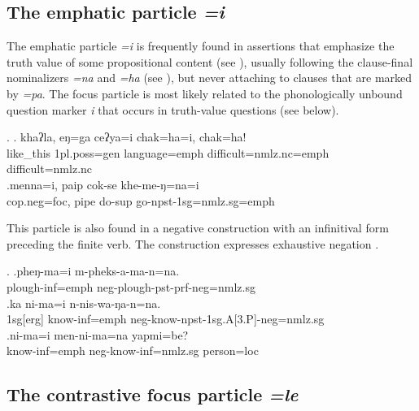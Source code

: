 \subsection{The emphatic particle \emph{=i}}
 
 The emphatic  particle \emph{=i} is frequently found  in assertions that emphasize the truth value of some propositional content (see \Next ), usually following the clause-final nominalizers \emph{=na} and \emph{=ha} (see ), but never attaching to clauses that are marked by \emph{=pa}. The focus particle is most likely related to the phonologically unbound question marker \emph{i} that occurs in truth-value questions (see below).

 
 \ex. \ag. khaʔla,  eŋ=ga              ceʔya=i   chak=ha=i, chak=ha!\\
	 like\_this {\sc 1pl.poss=gen} language{\sc =emph} difficult{\sc =nmlz.nc=emph} difficult{\sc =nmlz.nc}  \\
	  
	 	 \bg.menna=i, paip cok-se khe-me-ŋ=na=i\\
	 {\sc cop.neg=foc}, pipe do{\sc -sup} go{\sc -npst-1sg=nmlz.sg=emph}\\
	
	
This  particle is also found in a negative construction with an infinitival form preceding the finite verb. The construction expresses exhaustive negation .
	
\ex. \ag.pheŋ-ma=i              m-pheks-a-ma-n=na.\\
plough{\sc -inf=emph} {\sc neg-}plough{\sc [3sg]-pst-prf-neg=nmlz.sg}\\
\bg.ka  ni-ma=i          n-nis-wa-ŋa-n=na.\\
{\sc 1sg[erg]} know{\sc -inf=emph} {\sc neg-}know{\sc -npst-1sg.A[3.P]-neg=nmlz.sg}\\
\bg.ni-ma=i          men-ni-ma=na              yapmi=be?\\
know{\sc -inf=emph} {\sc neg-}know{\sc -inf=nmlz.sg} person{\sc =loc}\\
 
 
\subsection{The contrastive focus particle \emph{=le}}
   
